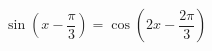 \begin{ex}[type=equation]
	\begin{condition}
		$\ \sin {\left(x -\dfrac{\pi }{3}\right)} =\cos {\left(2x -\dfrac{2\pi }{3}\right)}$
	\end{condition}
\end{ex}